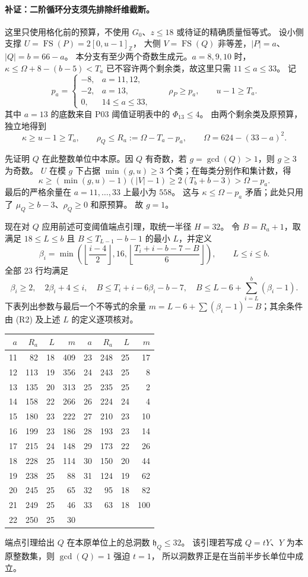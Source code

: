 \paragraph{补证：二阶循环分支须先排除纤维截断。}
这里只使用格化前的预算，不使用 $G_0$、$z\le18$ 或待证的精确质量恒等式。
设小侧支撑 $U=\operatorname{FS}(P)=2[0,u-1]_{\mathbb Z}$，
大侧 $V=\operatorname{FS}(Q)$ 非等差，$|P|=a$、$|Q|=b=66-a$。
本分支有至少两个奇数生成元。$a=8,9,10$ 时，
$\kappa\le\Omega+8-(b-5)<T_a$ 已不容许两个剩余类，故这里只需 $11\le a\le33$。
记
\[
 p_a=\begin{cases}-8,&a=11,12,\\-2,&a=13,\\0,&14\le a\le33,\end{cases}
 \qquad \rho_P\ge p_a,\qquad u-1\ge T_a.
\]
其中 $a=13$ 的底数来自 P03 阈值证明表中的 $\Phi_{13}\le4$。
由两个剩余类及原预算，独立地得到
\[
 \kappa\ge u-1\ge T_a,\qquad
 \rho_Q\le R_a:=\Omega-T_a-p_a,\qquad \Omega=624-(33-a)^2. \tag{R1}
\]

先证明 $Q$ 在此整数单位中本原。因 $Q$ 有奇数，若 $g=\gcd(Q)>1$，则 $g\ge3$ 为奇数。
$U$ 在模 $g$ 下占据 $\min(g,u)\ge3$ 个类；在每类分别作和集计数，得
\[
 \kappa\ge(\min(g,u)-1)(|V|-1)
 \ge2(T_b+b-3)>\Omega-p_a.
\]
最后的严格余量在 $a=11,\ldots,33$ 上最小为 $558$。
这与 $\kappa\le\Omega-p_a$ 矛盾；此处只用了 $\mu_Q\ge b-3$、$\rho_Q\ge0$ 和原预算。
故 $g=1$。

现在对 $Q$ 应用前述可变阈值端点引理，取统一半径 $H=32$。
令 $B=R_a+1$，取满足 $18\le L\le b$ 且 $B\le T_{L-1}-b-1$ 的最小 $L$，并定义
\[
 \beta_i=\min\left(\left\lfloor\frac{i-4}{2}\right\rfloor,16,
             \left\lfloor\frac{T_i+i-b-7-B}{6}\right\rfloor\right),
 \qquad L\le i\le b. \tag{R2}
\]
全部 23 行均满足
\[
 \beta_i\ge2,\quad 2\beta_i+4\le i,\quad
 B\le T_i+i-6\beta_i-b-7,\quad
 B\le L-6+\sum_{i=L}^{b}(\beta_i-1). \tag{R3}
\]
下表列出参数与最后一个不等式的余量
$m=L-6+\sum(\beta_i-1)-B$；其余条件由 (R2) 及上述 $L$ 的定义逐项核对。
\begin{center}\small
\begin{tabular}{rrrr@{\qquad}rrrr}
\toprule
$a$&$R_a$&$L$&$m$&$a$&$R_a$&$L$&$m$\\\midrule
11&82&18&409&23&248&25&17\\
12&113&19&356&24&243&25&8\\
13&135&20&313&25&235&25&2\\
14&158&22&266&26&224&24&4\\
15&180&23&222&27&210&23&10\\
16&199&23&186&28&193&23&14\\
17&215&24&148&29&173&22&26\\
18&228&25&114&30&150&20&44\\
19&238&25&88&31&124&19&62\\
20&245&25&65&32&95&18&82\\
21&249&25&46&33&63&18&100\\
22&250&25&30&&&&\\\bottomrule
\end{tabular}
\end{center}
端点引理给出 $Q$ 在本原单位上的总洞数 $\mathfrak h_Q\le32$。
该引理若写成 $Q=tY$、$Y$ 为本原整数集，则 $\gcd(Q)=1$ 强迫 $t=1$，
所以洞数界正是在当前半步长单位中成立。

